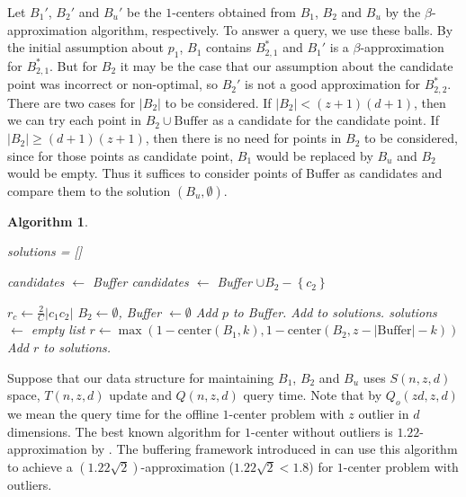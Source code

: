 \documentclass[envcountsame]{cls/cccg15}
\newtheorem{algorithm}{Algorithm}
\newcommand{\set}[1]{\left\{ #1 \right\}}
\newcommand{\card}[1]{\left|{#1}\right|}
\newcommand{\gee}{\geqslant}
\renewcommand{\geq}{\gee}
\renewcommand{\ge}{\gee}
\begin{document}
Let $B_1'$, $B_2'$ and $B_u'$ be the $1$-centers obtained from $B_1$, $B_2$ and $B_u$ by the $\beta$-approximation algorithm, respectively. To answer a query, we use these balls. By the initial assumption about $p_1$, $B_1$ contains $B_{2,1}^*$ and $B_1'$ is a $\beta$-approximation for $B_{2,1}^*$. But for $B_2$ it may be the case that our assumption about the candidate point was incorrect or non-optimal, so $B_2'$ is not a good approximation for $B_{2,2}^*$. There are two cases for $\card{B_2}$ to be considered. If $\card{B_2} < (z+1)(d+1)$, then we can try each point in $B_2 \cup \mbox{Buffer}$ as a candidate for the candidate point. If $\card{B_2} \ge (d+1)(z+1)$, then there is no need for points in $B_2$ to be considered, since for those points as candidate point, $B_1$ would be replaced by $B_u$ and $B_2$ would be empty. Thus it suffices to consider points of Buffer as candidates and compare them to the solution $(B_u, \emptyset)$.
{
\algrenewcommand\algorithmicindent{0.8em}%
\begin{algorithm}
\label{alg:query}
\leavevmode
\begin{algorithmic}
	\State solutions = []
	
	\If {$\card{B_2} \geq (d+1)(z+1)$}
		\State candidates $\gets$ Buffer
	\Else
		\State candidates $\gets$ Buffer $\cup B_2 - \set{c_2}$
	\EndIf

		\State $r_c \gets \frac{2}{C} \card{c_1 c_2}$
		\State $B_2 \gets \emptyset$, Buffer $\gets \emptyset$ 
				\State Add $p$ to Buffer.
			\EndIf
		\EndFor
		\State Add  to solutions.
	\EndFor
	\State \Return {}
\EndFunction
\Statex
{}
	\State solutions $\gets$ empty list
	\For{$k \gets 0, \dots,(z - \card{\mbox{Buffer}})$}
		\State $r \gets \max(1-\mbox{center}(B_1, k), 1-\mbox{center}(B_2, z - \card{\mbox{Buffer}} - k))$
		\State Add $r$ to solutions.
	\EndFor
	\State \Return {}
\EndFunction
\end{algorithmic}
\end{algorithm}
}

Suppose that our data structure for maintaining $B_1$, $B_2$ and $B_u$ uses $S(n,z,d)$ space, $T(n,z,d)$ update and $Q(n,z,d)$ query time. Note that by $Q_{o}(zd,z,d)$ we mean the query time for the offline $1$-center problem with $z$ outlier in $d$ dimensions. The best known algorithm for $1$-center without outliers is $1.22$-approximation by \cite{chan2014streaming, agarwal2010streaming}. The buffering framework introduced in \cite{zarrabi2009streaming} can use this algorithm to achieve a $(1.22\sqrt{2})$-approximation ($1.22\sqrt{2} < 1.8$) for $1$-center problem with outliers.
\end{document}
